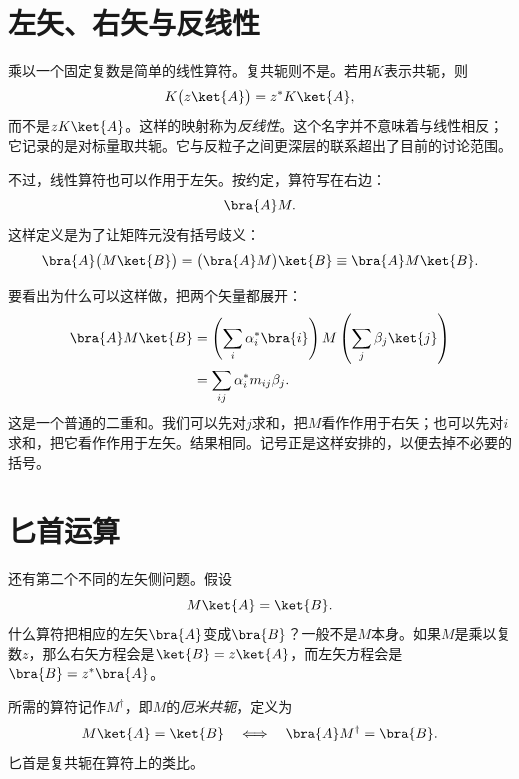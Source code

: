 \section{左矢、右矢与反线性}

\begin{classroomqa}
\end{classroomqa}

乘以一个固定复数是简单的线性算符。复共轭则不是。若用\(K\)表示共轭，则
\[
K\bigl(z\ket{A}\bigr)=z^*K\ket{A},
\]
而不是\(zK\ket{A}\)。这样的映射称为\emph{反线性}。这个名字并不意味着与线性相反；它记录的是对标量取共轭。它与反粒子之间更深层的联系超出了目前的讨论范围。

不过，线性算符也可以作用于左矢。按约定，算符写在右边：
\begin{equation}
\bra{A}M.
\end{equation}
这样定义是为了让矩阵元没有括号歧义：
\begin{equation}
\bra{A}\bigl(M\ket{B}\bigr)
=
\bigl(\bra{A}M\bigr)\ket{B}
\equiv
\bra{A}M\ket{B}.
\label{eq:bracket-independence}
\end{equation}

要看出为什么可以这样做，把两个矢量都展开：
\begin{align}
\bra{A}M\ket{B}
 &=\left(\sum_i\alpha_i^*\bra{i}\right)
   M
   \left(\sum_j\beta_j\ket{j}\right)\\
 &=\sum_{ij}\alpha_i^*m_{ij}\beta_j.
\label{eq:matrix-element-double-sum}
\end{align}
这是一个普通的二重和。我们可以先对\(j\)求和，把\(M\)看作作用于右矢；也可以先对\(i\)求和，把它看作作用于左矢。结果相同。记号正是这样安排的，以便去掉不必要的括号。

\section{匕首运算}

还有第二个不同的左矢侧问题。假设
\[
M\ket{A}=\ket{B}.
\]
什么算符把相应的左矢\(\bra{A}\)变成\(\bra{B}\)？一般不是\(M\)本身。如果\(M\)是乘以复数\(z\)，那么右矢方程会是\(\ket{B}=z\ket{A}\)，而左矢方程会是\(\bra{B}=z^*\bra{A}\)。

所需的算符记作\(M^\dagger\)，即\(M\)的\emph{厄米共轭}，定义为
\begin{equation}
M\ket{A}=\ket{B}
\quad\Longleftrightarrow\quad
\bra{A}M^\dagger=\bra{B}.
\label{eq:dagger-definition}
\end{equation}
匕首是复共轭在算符上的类比。


